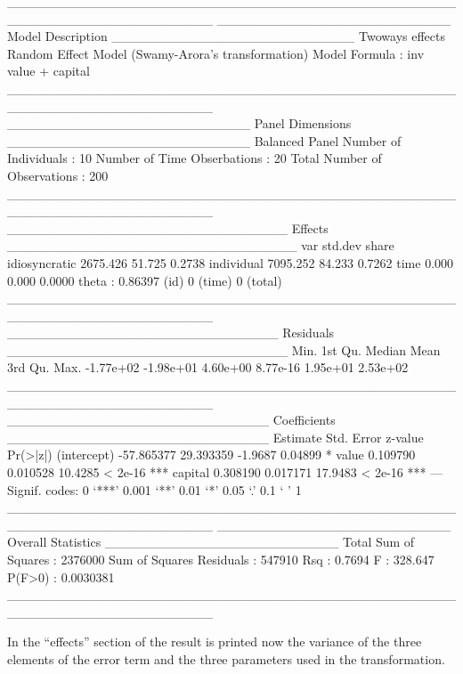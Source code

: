 \documentclass{article}
\begin{document}
\begin{Schunk}
\begin{Soutput}
______________________________________________________________________ 
_________________________ Model Description __________________________
Twoways effects
Random Effect Model (Swamy-Arora's transformation)
Model Formula             : inv ~ value + capital
______________________________________________________________________ 
__________________________ Panel Dimensions __________________________
Balanced Panel
Number of Individuals        :  10
Number of Time Obserbations  :  20
Total Number of Observations :  200
______________________________________________________________________ 
______________________________ Effects _______________________________
                   var  std.dev  share
idiosyncratic 2675.426   51.725 0.2738
individual    7095.252   84.233 0.7262
time             0.000    0.000 0.0000
theta  : 0.86397 (id) 0 (time) 0 (total)
______________________________________________________________________ 
_____________________________ Residuals ______________________________
     Min.   1st Qu.    Median      Mean   3rd Qu.      Max. 
-1.77e+02 -1.98e+01  4.60e+00  8.77e-16  1.95e+01  2.53e+02 
______________________________________________________________________ 
____________________________ Coefficients ____________________________
              Estimate Std. Error z-value Pr(>|z|)    
(intercept) -57.865377  29.393359 -1.9687  0.04899 *  
value         0.109790   0.010528 10.4285  < 2e-16 ***
capital       0.308190   0.017171 17.9483  < 2e-16 ***
---
Signif. codes:  0 ‘***’ 0.001 ‘**’ 0.01 ‘*’ 0.05 ‘.’ 0.1 ‘ ’ 1 
______________________________________________________________________ 
_________________________ Overall Statistics _________________________
Total Sum of Squares       : 2376000
Sum of Squares Residuals   : 547910
Rsq                        : 0.7694
F                          : 328.647
P(F>0)                     : 0.0030381
______________________________________________________________________ 
\end{Soutput}
\end{Schunk}

In the ``effects'' section of the result is printed now the variance
of the three elements of the error term and the three parameters used
in the transformation. 
\end{document}
